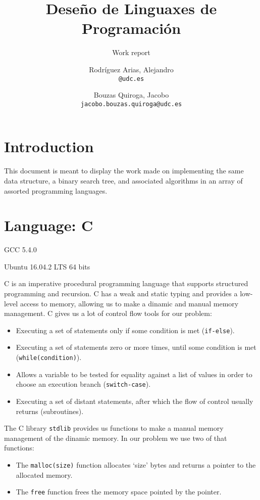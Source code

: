 \documentclass[11pt]{scrartcl} %
\title{Deseño de Linguaxes de Programación}
\subtitle{Work report}
\author{Rodríguez Arias, Alejandro\\
	\texttt{@udc.es}
	\and Bouzas Quiroga, Jacobo\\
	\texttt{jacobo.bouzas.quiroga@udc.es}}
\date{\displaydate{release}}
\begin{document}
\maketitle
\clearpage
\tableofcontents
\clearpage

\section{Introduction}

This document is meant to display the work made on implementing the same data structure, a binary search tree, and associated algorithms in an array of assorted programming languages.

\section{Language: C}

\begin{description}[align=left,labelwidth=10em]
\item [Compiler] GCC 5.4.0
\item [Operating System] Ubuntu 16.04.2 LTS 64 bits
\end{description}

C is an imperative procedural programming language that supports structured programming and recursion. C has a weak and static typing and provides a low-level access to memory, allowing us to make a dinamic and manual memory management. C gives us a lot of control flow tools for our problem:

\begin{itemize}  
\item Executing a set of statements only if some condition is met (\texttt{if-else}).
\item Executing a set of statements zero or more times, until some condition is met (\texttt{while(condition)}). 
\item Allows a variable to be tested for equality against a list of values in order to choose an execution branch (\texttt{switch-case}).
\item Executing a set of distant statements, after which the flow of control usually returns (subroutines).
\end{itemize}

The C library \texttt{stdlib} provides us  functions to make a manual memory management of the dinamic memory. In our problem we use two of that functions:
\begin{itemize}
\item The \texttt{malloc(size)} function allocates `size' bytes and returns a pointer to the allocated memory.
\item The \texttt{free} function frees the memory space pointed by the pointer.
\end{itemize}
	
\end{document}
